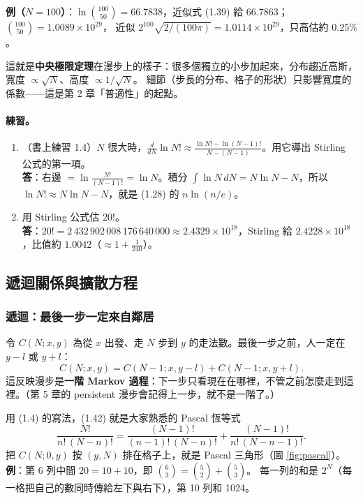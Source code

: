 \textbf{例（$N=100$）}：$\ln\binom{100}{50}=66.7838$，近似式 (1.39) 給 $66.7863$；$\binom{100}{50}=1.0089\times10^{29}$，
近似 $2^{100}\sqrt{2/(100\pi)}=1.0114\times10^{29}$，只高估約 $0.25\%$。

這就是\textbf{中央極限定理}在漫步上的樣子：很多個獨立的小步加起來，分布趨近高斯，寬度 $\propto\sqrt N$、高度 $\propto1/\sqrt N$。
細節（步長的分布、格子的形狀）只影響寬度的係數——這是第 2 章「普適性」的起點。

\paragraph{練習。}
\begin{enumerate}[label=(\alph*)]
\item （書上練習 1.4）$N$ 很大時，$\frac{d}{dN}\ln N!\approx\frac{\ln N!-\ln(N-1)!}{N-(N-1)}$。用它導出 Stirling 公式的第一項。\\
  \textbf{答}：右邊 $=\ln\frac{N!}{(N-1)!}=\ln N$。積分 $\int\ln N\,dN=N\ln N-N$，所以 $\ln N!\approx N\ln N-N$，就是 (1.28) 的 $n\ln(n/e)$。
\item 用 Stirling 公式估 $20!$。\\
  \textbf{答}：$20!=2\,432\,902\,008\,176\,640\,000\approx2.4329\times10^{18}$，Stirling 給 $2.4228\times10^{18}$，比值約 $1.0042$（$\approx1+\frac1{240}$）。
\end{enumerate}

\subsection{遞迴關係與擴散方程}

\subsubsection*{遞迴：最後一步一定來自鄰居}
令 $C(N;x,y)$ 為從 $x$ 出發、走 $N$ 步到 $y$ 的走法數。最後一步之前，人一定在 $y-l$ 或 $y+l$：
\begin{equation}
C(N;x,y)=C(N-1;x,y-l)+C(N-1;x,y+l). \tag{1.42}
\end{equation}
這反映漫步是\textbf{一階 Markov 過程}：下一步只看現在在哪裡，不管之前怎麼走到這裡。（第 5 章的 persistent 漫步會記得上一步，就不是一階了。）

用 (1.4) 的寫法，(1.42) 就是大家熟悉的 Pascal 恆等式
\begin{equation}
\frac{N!}{n!\,(N-n)!}=\frac{(N-1)!}{(n-1)!\,(N-n)!}+\frac{(N-1)!}{n!\,(N-n-1)!}. \tag{1.43}
\end{equation}
把 $C(N;0,y)$ 按 $(y,N)$ 排在格子上，就是 Pascal 三角形（圖 \ref{fig:pascal}）。\textbf{例}：第 6 列中間 $20=10+10$，即 $\binom63=\binom52+\binom53$。
每一列的和是 $2^N$（每一格把自己的數同時傳給左下與右下），第 10 列和 1024。

